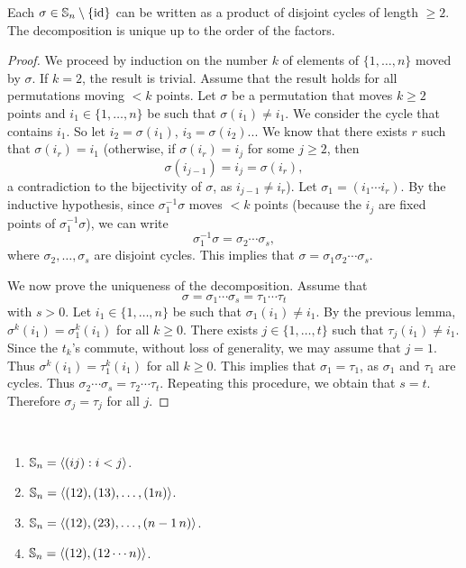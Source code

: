 \begin{theorem}
Each $\sigma\in\mathbb{S}_n\setminus\{\operatorname{id}\}$ can be written as a product
of disjoint cycles of length 
 $\geq2$. The decomposition is unique up to 
 the order of the factors. 
 \end{theorem}

\begin{proof}
    We proceed by induction on the number $k$ 
    of elements of $\{1,\dots,n\}$ moved by $\sigma$. If $k=2$, 
    the result is trivial. Assume that the result 
    holds for all permutations moving $<k$ points. Let
    $\sigma$ be a permutation that moves $k\geq2$ points and 
    $i_1\in\{1,\dots,n\}$ be such that $\sigma(i_1)\ne i_1$. We 
    consider the cycle that contains $i_1$. So let 
        $i_2=\sigma(i_1)$, $i_3=\sigma(i_2)$... We know that 
        there exists $r$ such that $\sigma(i_r)=i_1$
        (otherwise, if $\sigma(i_r)=i_j$ for some 
        $j\geq2$, then 
        \[
        \sigma(i_{j-1})=i_j=\sigma(i_r),
        \]
        a contradiction to the bijectivity of $\sigma$, as $i_{j-1}\ne i_r$). 
        Let $\sigma_1=(i_1\cdots i_r)$. By the inductive hypothesis, since 
        $\sigma_1^{-1}\sigma$ moves $<k$ points (because 
        the $i_j$ are fixed points of $\sigma_1^{-1}\sigma$), 
        we can write \[
        \sigma_1^{-1}\sigma=\sigma_2\cdots\sigma_s,
        \]
        where 
        $\sigma_2,\dots,\sigma_s$ are disjoint cycles. 
        This implies that $\sigma=\sigma_1\sigma_2\cdots\sigma_s$.

        We now prove the uniqueness of the decomposition. 
        Assume that 
        \[
        \sigma=\sigma_1\cdots\sigma_s=\tau_1\cdots\tau
_t
\]
with $s>0$. Let $i_1\in\{1,\dots,n\}$ be such that 
        $\sigma_1(i_1)\ne i_1$. By the previous lemma, $\sigma^k(i_1)=\sigma_1^k(i_1)$ for all $k\geq0$.
        There exists $j\in\{1,\dots,t\}$ such that 
        $\tau_j(i_1)\ne i_1$. Since the $t_k$'s commute, 
        without loss of generality, we may assume that $j=
1$. Thus $\sigma^k(i_1)=\tau_1^k(i_1)$ for all $k\geq0$.  
This implies that 
        $\sigma_1=\tau_1$, as $\sigma_1$ and $\tau_1$ are cycles. 
        Thus $\sigma_2\cdots\sigma_s=\tau_2\cdots\tau_t$. Repeating
        this procedure, we obtain that $s=t$. Therefore 
        $\sigma_j=\tau_j$ for all $j$.
\end{proof}

\begin{corollary}\
\label{cor:generation}
        \begin{enumerate}
                \item $\mathbb{S}_n=\langle (ij):i<j\rangle$.
                \item $\mathbb{S}_n=\langle (12),(13),\dots,(1n)\rangle$.
                \item $\mathbb{S}_n=\langle (12),(23),\dots,(n-1\,n)\rangle$.
                \item $\mathbb{S}_n=\langle (12),(12\cdots n)\rangle$.
        \end{enumerate}
\end{corollary}


